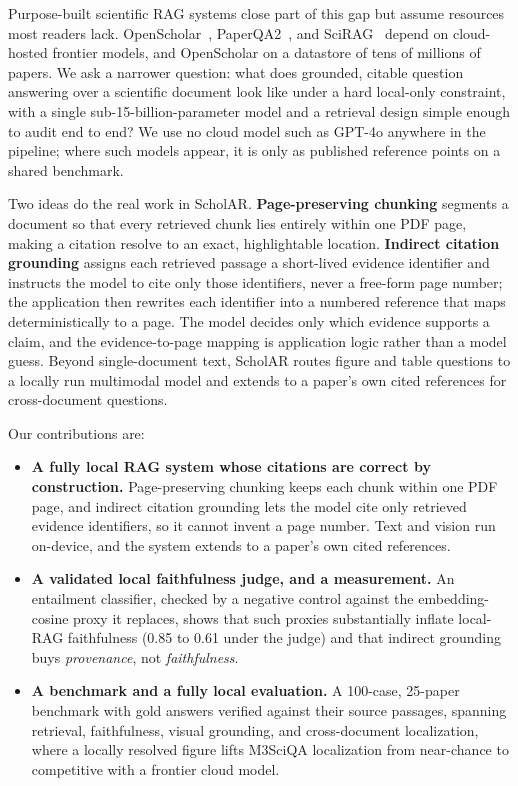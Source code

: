 \documentclass[letterpaper]{article} %
\begin{document}
Purpose-built scientific RAG systems close part of this gap but assume resources most readers lack.
OpenScholar~\citep{asai2024openscholar}, PaperQA2~\citep{lala2024paperqa2}, and
SciRAG~\citep{ding2025scirag} depend on cloud-hosted frontier models, and OpenScholar on a datastore
of tens of millions of papers. We ask a narrower question: what does grounded, citable question
answering over a scientific document look like under a hard local-only constraint, with a single
sub-15-billion-parameter model and a retrieval design simple enough to audit end to end? We use no
cloud model such as GPT-4o anywhere in the pipeline; where such models appear, it is only as
published reference points on a shared benchmark.

Two ideas do the real work in ScholAR. \textbf{Page-preserving chunking} segments a document so that every
retrieved chunk lies entirely within one PDF page, making a citation resolve to an exact,
highlightable location. \textbf{Indirect citation grounding} assigns each retrieved passage a
short-lived evidence identifier and instructs the model to cite only those identifiers, never a
free-form page number;
the application then rewrites each identifier into a numbered reference that maps deterministically
to a page. The model decides only which evidence supports a claim, and the evidence-to-page mapping
is application logic rather than a model guess. Beyond single-document text,
ScholAR routes figure and table questions to a locally run multimodal model and extends to a
paper's own cited references for cross-document questions.

Our contributions are:
\begin{itemize}
  \item \textbf{A fully local RAG system whose citations are correct by construction.}
        Page-preserving chunking keeps each chunk within one PDF page, and indirect citation
        grounding lets the model cite only retrieved evidence identifiers, so it cannot invent a
        page number. Text and vision run on-device, and the system extends to a paper's own cited
        references.
  \item \textbf{A validated local faithfulness judge, and a measurement.} An entailment
        classifier, checked by a negative control against the embedding-cosine proxy it replaces,
        shows that such proxies substantially inflate local-RAG faithfulness (0.85 to 0.61 under the
        judge) and that indirect grounding buys \emph{provenance}, not \emph{faithfulness}.
  \item \textbf{A benchmark and a fully local evaluation.} A 100-case, 25-paper benchmark with
        gold answers verified against their source passages, spanning retrieval, faithfulness,
        visual grounding, and cross-document localization, where a locally resolved figure lifts
        M3SciQA localization from near-chance to competitive with a frontier cloud model.
\end{itemize}
\end{document}
